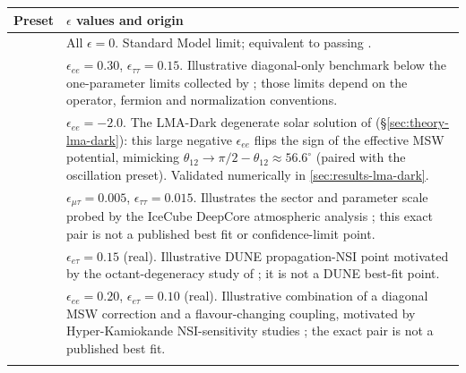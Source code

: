 \begin{implbox}
\begin{center}
\small
\begin{tabular}{@{}ll@{}}
\toprule
Preset & $\epsilon$ values and origin \\
\midrule
\parbox[t]{3.2cm}{} &
  \parbox[t]{9.4cm}{All $\epsilon=0$. Standard Model limit; equivalent to
  passing .} \\[10pt]
\parbox[t]{3.2cm}{} &
  \parbox[t]{9.4cm}{$\epsilon_{ee}=0.30$, $\epsilon_{\tau\tau}=0.15$.
  Illustrative diagonal-only benchmark below the one-parameter limits
  collected by \textcite{BiggioBlennowFM2009}; those limits depend on the
  operator, fermion and normalization conventions.} \\[18pt]
\parbox[t]{3.2cm}{} &
  \parbox[t]{9.4cm}{$\epsilon_{ee}=-2.0$. The LMA-Dark degenerate solar
  solution of \textcite{Esteban2018LMADark} (\S\ref{sec:theory-lma-dark}):
  this large negative $\epsilon_{ee}$ flips the sign of the effective MSW
  potential, mimicking $\theta_{12}\to\pi/2-\theta_{12}\approx56.6^\circ$
  (paired with the  oscillation preset).
  Validated numerically in \cref{sec:results-lma-dark}.} \\[26pt]
\parbox[t]{3.2cm}{} &
  \parbox[t]{9.4cm}{$\epsilon_{\mu\tau}=0.005$, $\epsilon_{\tau\tau}=0.015$.
  Illustrates the sector and parameter scale probed by the IceCube DeepCore
  atmospheric analysis \parencite{IceCube2022NSI}; this exact pair is not a
  published best fit or confidence-limit point.} \\[18pt]
\parbox[t]{3.2cm}{} &
  \parbox[t]{9.4cm}{$\epsilon_{e\tau}=0.15$ (real). Illustrative DUNE
  propagation-NSI point motivated by the octant-degeneracy study of
  \textcite{Agarwalla2016DUNENSI}; it is not a DUNE best-fit point.} \\[18pt]
\parbox[t]{3.2cm}{} &
  \parbox[t]{9.4cm}{$\epsilon_{ee}=0.20$, $\epsilon_{e\tau}=0.10$ (real).
  Illustrative combination of a diagonal MSW correction and a
  flavour-changing coupling, motivated by Hyper-Kamiokande NSI-sensitivity
  studies \parencite{Kelly2017HyperKNSI,Fukasawa2017HyperKNSI}; the exact
  pair is not a published best fit.} \\[18pt]
\parbox[t]{3.2cm}{} &

\end{tabular}
\end{center}
\end{implbox}
